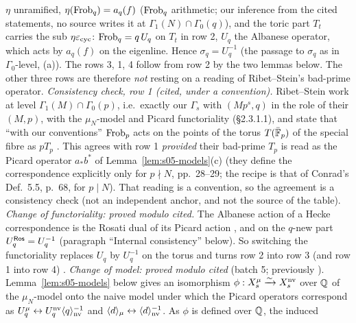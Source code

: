 \begin{remark}
$\eta$ unramified, $\eta(\mathrm{Frob}_q)=a_q(f)$ ($\mathrm{Frob}_q$ arithmetic; our inference from the cited statements, no source writes it at $\Gamma_1(N)\cap\Gamma_0(q)$), and the
toric part $T_t$ carries the sub $\eta\varepsilon_{\rm cyc}$: $\mathrm{Frob}_q=q\,U_q$ on $T_t$ in row 2, $U_q$ the Albanese operator, which acts by $a_q(f)$
on the eigenline. Hence $\sigma_q=U_q^{-1}$ \stpmc{} (the passage to $\sigma_q$ as in $\Gamma_0$-level, (a)). The rows 3, 1, 4 follow from row 2 by the two
lemmas below. The other three rows are therefore \emph{not} resting on a reading of Ribet--Stein's bad-prime operator.
\emph{Consistency check, row 1 (cited, under a convention).} Ribet--Stein work at level $\Gamma_1(M)\cap\Gamma_0(p)$, i.e.\ exactly our
$\Gamma_s$ with $(Mp^s,q)$ in the role of their $(M,p)$, with the $\mu_N$-model and Picard functoriality (\S2.3.1.1), and state that
``with our conventions'' $\mathrm{Frob}_p$ acts on the points of the torus $T(\bar{\mathbb{F}}_p)$ of the special fibre as $pT_p$
. This agrees with row 1 \emph{provided} their bad-prime $T_p$ is read as the
Picard operator $a_*b^*$ of Lemma~\ref{lem:s05-models}(c) (they define the correspondence explicitly only for $p\nmid N$, pp.~28--29; the recipe is
that of Conrad's Def.~5.5, p.~68, for $p\mid N$). That reading is a convention, so the agreement is a consistency check (not an
independent anchor, and not the source of the table).
\emph{Change of functoriality: proved modulo cited.} The Albanese action of a Hecke correspondence is the Rosati dual of its Picard
action , and on the $q$-new part $U_q^{\mathsf{Ros}}=U_q^{-1}$ (paragraph
``Internal consistency'' below). So switching the functoriality replaces $U_q$ by $U_q^{-1}$ on the torus and turns row 2 into row 3 (and row 1 into row 4) \stpmc.
\emph{Change of model: proved modulo cited} (batch 5; previously \stexp). Lemma~\ref{lem:s05-models} below gives an isomorphism
$\phi:X^\mu_s\xrightarrow{\sim}X^{\rm nv}_s$ over $\mathbb{Q}$ of the $\mu_N$-model onto the naive model under which the Picard operators correspond as
$U^\mu_q\leftrightarrow U^{\rm nv}_q\langle q\rangle_{\rm nv}^{-1}$ and $\langle d\rangle_\mu\leftrightarrow\langle d\rangle_{\rm nv}^{-1}$. As $\phi$ is defined over $\mathbb{Q}$, the induced

\end{remark}
